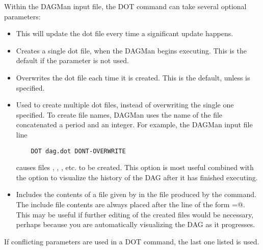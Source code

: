 Within the DAGMan input file,
the DOT command can take several optional parameters:

\begin{itemize}

\item {}  This will update the dot file every time a
significant update happens. 

\item {} Creates a single dot file, when
the DAGMan begins executing. This is the default if the parameter
 is not used.

\item {} Overwrites the dot file each time it
is created. This is the default, unless 
is specified.

\item {} Used to create multiple dot files, instead
of overwriting the single one specified.
To create file names,
DAGMan uses the name of the file concatenated a period and an
integer. For example, the DAGMan input file line
\begin{verbatim}
	DOT dag.dot DONT-OVERWRITE
\end{verbatim}
causes files
,
,
,
etc. to be created.
This option is
most useful combined with the  option to
visualize the history of the DAG after it has finished executing. 

\item {} Includes the contents
of a file given by  in the file produced by the
 command.
The include file contents are always placed after the line of
the form
\verb@label=@.
This may be useful if further editing of the created files would
be necessary,
perhaps because you are automatically visualizing the DAG as it
progresses. 

\end{itemize}

If conflicting parameters are used in a DOT command, the last one
listed is used.
